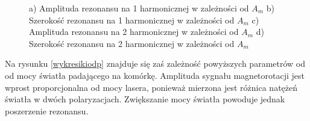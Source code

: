 \documentclass[a4paper,10pt]{article}
\begin{document}
\begin{figure}[h!]
\centering
{}


\caption{ a) Amplituda rezonansu na 1 harmonicznej w zależności od $A_m$ b) Szerokość rezonansu na 1 harmonicznej w zależności od $A_m$ 
c) Amplituda rezonansu na 2 harmonicznej w zależności od $A_m$ d) Szerokość rezonansu na 2 harmonicznej w zależności od $A_m$}
\label{wykresikioda}
\end{figure}


Na rysunku \ref{wykresikiodp} znajduje się zaś zależność powyższych parametrów od od mocy światła padającego na komórkę. Amplituda sygnału magnetorotacji jest wprost proporcjonalna od mocy lasera, ponieważ mierzona jest różnica natężeń światła w dwóch polaryzacjach. Zwiększanie mocy światła powoduje jednak poszerzenie rezonansu.
\end{document}
